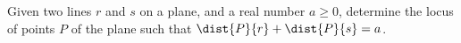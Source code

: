 Given two lines $r$ and $s$ on a plane,
and a real number $a \geq 0$,
determine the locus of points $P$ of the plane
such that $\dist{P}{r} + \dist{P}{s} = a$.
